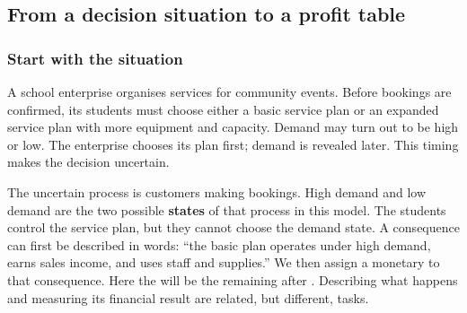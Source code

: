 \clearpage
\subsection{From a decision situation to a profit table}
\label{subsec:intro-first-steps}

\subsubsection*{Start with the situation}
A school enterprise organises services for community events. Before bookings
are confirmed, its students must choose either a basic service plan or an
expanded service plan with more equipment and capacity. Demand may turn out
to be high or low. The enterprise chooses its plan first; demand is revealed
later. This timing makes the decision uncertain.

The uncertain process is customers making bookings. High demand and low
demand are the two possible \textbf{states} of that process in this model.
The students control the service plan, but they cannot choose the demand state.
A consequence can first be described in words: ``the basic plan operates under
high demand, earns sales income, and uses staff and supplies.'' We then assign
a monetary  to that consequence. Here the  will be the 
remaining after . Describing what happens and measuring its financial
result are related, but different, tasks.


